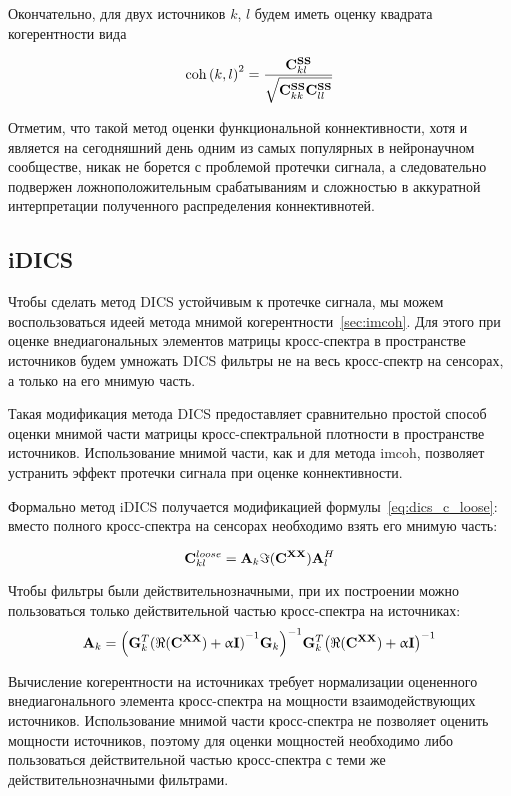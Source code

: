 Окончательно, для двух источников $k$, $l$ будем иметь оценку квадрата когерентности вида

\begin{equation}
    \operatorname{coh}{(k, l)}^2 = \frac{\mathbf{C}^{\mathbf{S S}}_{kl}}{\sqrt{\mathbf{C}^{\mathbf{S S}}_{kk} \mathbf{C}^{\mathbf{S S}}_{ll}}}
\end{equation}

Отметим, что такой метод оценки функциональной коннективности, хотя и является на сегодняшний
день одним из самых популярных в нейронаучном сообществе, никак не борется с проблемой
протечки сигнала, а следовательно подвержен ложноположительным срабатываниям и сложностью
в аккуратной интерпретации полученного распределения коннективнотей.

\subsection{iDICS}
Чтобы сделать метод DICS устойчивым к протечке сигнала, мы можем воспользоваться
идеей метода мнимой когерентности~\ref{sec:imcoh}. Для этого при оценке внедиагональных
элементов матрицы кросс-спектра в пространстве источников будем умножать DICS фильтры
не на весь кросс-спектр на сенсорах, а только на его мнимую часть.

Такая модификация метода DICS предоставляет сравнительно простой способ
оценки мнимой части матрицы кросс-спектральной плотности в пространстве
источников. Использование мнимой части, как и для метода imcoh, позволяет
устранить эффект протечки сигнала при оценке коннективности.

Формально метод iDICS получается модификацией формулы~\ref{eq:dics_c_loose}:
вместо полного кросс-спектра на сенсорах необходимо взять его мнимую часть:

\begin{equation}
    \mathbf{C}^{loose}_{kl} = \mathbf{A}_k \Im(\mathbf{C}^{\mathbf{X X}}) \mathbf{A}_l^H
    \label{eq:idics_c_loose}
\end{equation}

Чтобы фильтры были действительнозначными, при их построении
можно пользоваться только действительной частью кросс-спектра на источниках:
\begin{equation}
    \mathbf{A}_k =
    {\left(\mathbf{G}_k^T {(\Re(\mathbf{C}^{\mathbf{X X}}) + \upalpha \mathbf{I})}^{-1} \mathbf{G}_k\right)}^{-1}
    \mathbf{G}_k^T {\left(\Re(\mathbf{C}^{\mathbf{X X}}) + \upalpha \mathbf{I}\right)}^{-1}
    \label{eq:idics_filters}
\end{equation}

Вычисление когерентности на источниках требует нормализации оцененного
внедиагонального элемента кросс-спектра на мощности взаимодействующих
источников. Использование мнимой части кросс-спектра не позволяет
оценить мощности источников, поэтому для оценки мощностей необходимо либо
пользоваться действительной частью кросс-спектра с теми же действительнозначными
фильтрами.


